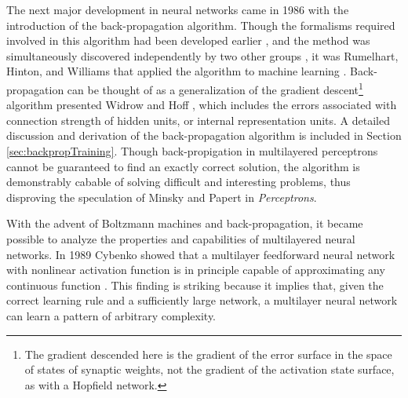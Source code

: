 \documentclass[11pt]{afthesis}
\begin{document}
	The next major development in neural networks came in 1986 with the introduction of the back-propagation algorithm. Though the formalisms required involved in this algorithm had been developed earlier \cite{bryson1969optimalcontrol} \cite{werbos1974beyondregression}, and the method was simultaneously discovered independently by two other groups \cite{parker1985logic} \cite{lecun1985}, it was Rumelhart, Hinton, and Williams that applied the algorithm to machine learning \cite{rumelhart1986internal}. Back-propagation can be thought of as a generalization of the gradient descent\footnote{The gradient descended here is the gradient of the error surface in the space of states of synaptic weights, not the gradient of the activation state surface, as with a Hopfield network.} algorithm presented Widrow and Hoff \cite{widrow1960asc}, which includes the errors associated with connection strength of hidden units, or internal representation units. A detailed discussion and derivation of the back-propagation algorithm is included in Section \ref{sec:backpropTraining}. Though back-propigation in multilayered perceptrons cannot be guaranteed to find an exactly correct solution, the algorithm is demonstrably cabable of solving difficult and interesting problems, thus disproving the speculation of Minsky and Papert in \textit{Perceptrons}.
	
	
	With the advent of Boltzmann machines and back-propagation, it became possible to analyze the properties and capabilities of multilayered neural networks. In 1989 Cybenko showed that a multilayer feedforward neural network with nonlinear activation function is in principle capable of approximating any continuous function  \cite{cybenko1989approxsuperposition}. This finding is striking because it implies that, given the correct learning rule and a sufficiently large network, a multilayer neural network can learn a pattern of arbitrary complexity. 
	
	
	
	
	
\end{document}
